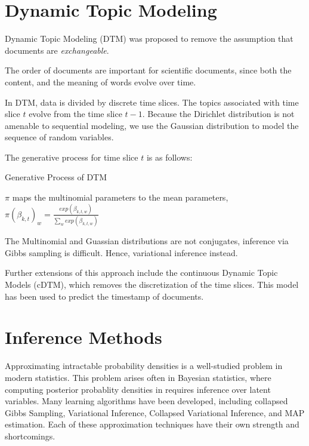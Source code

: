 \documentclass[letterpaper]{article}
\begin{document}
\section{Dynamic Topic Modeling}
\label{sec:dtm}
Dynamic Topic Modeling (DTM) was proposed to remove the assumption
that documents are \textit{exchangeable}. \cite{blei2006dynamic}

The order of documents are important for scientific documents, since
both the content, and the meaning of words evolve over time.

In DTM, data is divided by discrete time slices. The topics associated
with time slice $t$ evolve from the time slice $t-1$. Because the
Dirichlet distribution is not amenable to sequential modeling, we use
the Gaussian distribution to model the sequence of random variables.

The generative process for time slice $t$ is as follows:

\begin{algorithm}
  \caption{Generative Process of DTM}\label{alg:DTM}
  \begin{algorithmic}[1]
    \EndFor
    \EndFor
  \end{algorithmic}
\end{algorithm}

$\pi$ maps the multinomial parameters to the mean parameters,
$\pi\left( \beta_{k,t} \right)_w = \frac{exp(\beta_{k,t,w})}{\sum_w exp\left( \beta_{k,t,w} \right)}$

The Multinomial and Guassian distributions are not conjugates,
inference via Gibbs sampling is difficult. Hence, variational
inference instead.

Further extensions of this approach include the continuous Dynamic
Topic Models (cDTM), which removes the discretization of the time
slices. \cite{wang-2012-contin-time} This model has been used to
predict the timestamp of documents.

\section{Inference Methods}
\label{sec:inference}
Approximating intractable probability densities is a well-studied
problem in modern statistics. This problem arises often in Bayesian
statistics, where computing posterior probablity densities in requires
inference over latent variables. Many learning algorithms have been
developed, including collapsed Gibbs Sampling, Variational Inference,
Collapsed Variational Inference, and MAP estimation. Each of these
approximation techniques have their own strength and shortcomings.
\end{document}
